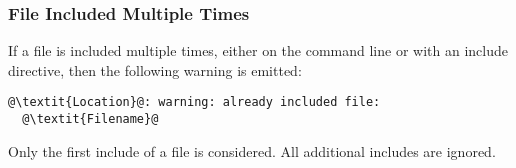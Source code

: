 \subsubsection{File Included Multiple Times}\label{sec:warn:incfile}
If a file is included multiple times,
either on the command line or with an include directive,
then the following warning is emitted:
\begin{lstlisting}[numbers=none,escapechar=@]
@\textit{Location}@: warning: already included file:
  @\textit{Filename}@
\end{lstlisting}


\begin{note}
Only the first include of a file is considered.
All additional includes are ignored.
\end{note}
